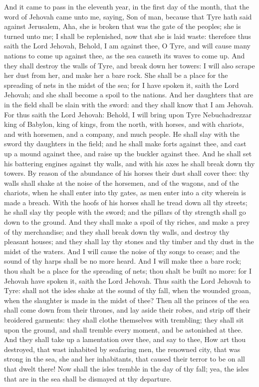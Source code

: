 And it came to pass in the eleventh year, in the first day of the month, that the word of Jehovah came unto me, saying, Son of man, because that Tyre hath said against Jerusalem, Aha, she is broken that was the gate of the peoples; she is turned unto me; I shall be replenished, now that she is laid waste: therefore thus saith the Lord Jehovah, Behold, I am against thee, O Tyre, and will cause many nations to come up against thee, as the sea causeth its waves to come up. And they shall destroy the walls of Tyre, and break down her towers: I will also scrape her dust from her, and make her a bare rock. She shall be a place for the spreading of nets in the midst of the sea; for I have spoken it, saith the Lord Jehovah; and she shall become a spoil to the nations. And her daughters that are in the field shall be slain with the sword: and they shall know that I am Jehovah.  For thus saith the Lord Jehovah: Behold, I will bring upon Tyre Nebuchadrezzar king of Babylon, king of kings, from the north, with horses, and with chariots, and with horsemen, and a company, and much people. He shall slay with the sword thy daughters in the field; and he shall make forts against thee, and cast up a mound against thee, and raise up the buckler against thee. And he shall set his battering engines against thy walls, and with his axes he shall break down thy towers. By reason of the abundance of his horses their dust shall cover thee: thy walls shall shake at the noise of the horsemen, and of the wagons, and of the chariots, when he shall enter into thy gates, as men enter into a city wherein is made a breach. With the hoofs of his horses shall he tread down all thy streets; he shall slay thy people with the sword; and the pillars of thy strength shall go down to the ground. And they shall make a spoil of thy riches, and make a prey of thy merchandise; and they shall break down thy walls, and destroy thy pleasant houses; and they shall lay thy stones and thy timber and thy dust in the midst of the waters. And I will cause the noise of thy songs to cease; and the sound of thy harps shall be no more heard. And I will make thee a bare rock; thou shalt be a place for the spreading of nets; thou shalt be built no more: for I Jehovah have spoken it, saith the Lord Jehovah.  Thus saith the Lord Jehovah to Tyre: shall not the isles shake at the sound of thy fall, when the wounded groan, when the slaughter is made in the midst of thee? Then all the princes of the sea shall come down from their thrones, and lay aside their robes, and strip off their broidered garments: they shall clothe themselves with trembling; they shall sit upon the ground, and shall tremble every moment, and be astonished at thee. And they shall take up a lamentation over thee, and say to thee, How art thou destroyed, that wast inhabited by seafaring men, the renowned city, that was strong in the sea, she and her inhabitants, that caused their terror to be on all that dwelt there! Now shall the isles tremble in the day of thy fall; yea, the isles that are in the sea shall be dismayed at thy departure. 